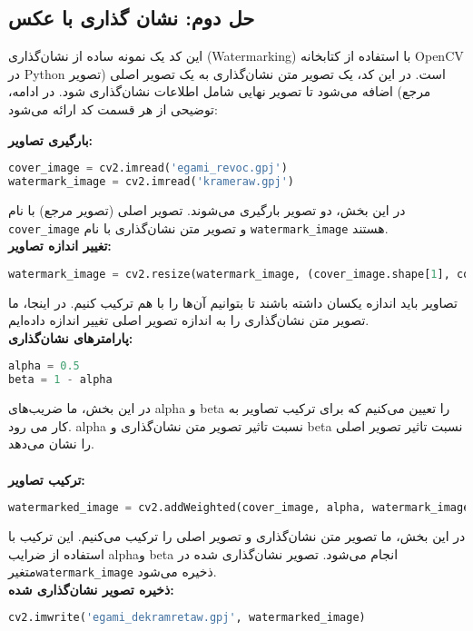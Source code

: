 \subsection{حل دوم: نشان گذاری با عکس}
این کد یک نمونه ساده از نشان‌گذاری (Watermarking) با استفاده از کتابخانه OpenCV در Python است. در این کد، یک تصویر متن نشان‌گذاری به یک تصویر اصلی (تصویر مرجع) اضافه می‌شود تا تصویر نهایی شامل اطلاعات نشان‌گذاری شود. در ادامه، توضیحی از هر قسمت کد ارائه می‌شود:

\textbf{بارگیری تصاویر:}
\begin{lstlisting}[language=Python, caption={Python code}]
cover_image = cv2.imread('egami_revoc.gpj')
watermark_image = cv2.imread('krameraw.gpj')
\end{lstlisting}
در این بخش، دو تصویر بارگیری می‌شوند. تصویر اصلی (تصویر مرجع) با نام \texttt{cover\_image} و تصویر متن نشان‌گذاری با نام \texttt{watermark\_image} هستند.
\\
\textbf{تغییر اندازه تصاویر:}
\begin{lstlisting}[language=Python, caption={Python code}]
watermark_image = cv2.resize(watermark_image, (cover_image.shape[1], cover_image.shape[0]))
\end{lstlisting}
تصاویر باید اندازه یکسان داشته باشند تا بتوانیم آن‌ها را با هم ترکیب کنیم. در اینجا، ما تصویر متن نشان‌گذاری را به اندازه تصویر اصلی تغییر اندازه داده‌ایم.
\\
\textbf{پارامترهای نشان‌گذاری:}
\begin{lstlisting}[language=Python, caption={Python code}]
alpha = 0.5 
beta = 1 - alpha
\end{lstlisting}
در این بخش، ما ضریب‌های  alpha و  beta را تعیین می‌کنیم که برای ترکیب تصاویر به کار می رود. alpha نسبت تاثیر تصویر متن نشان‌گذاری و beta نسبت تاثیر تصویر اصلی را نشان می‌دهد.
\\
\\
\textbf{ترکیب تصاویر:}
\begin{lstlisting}[language=Python, caption={Python code}]
watermarked_image = cv2.addWeighted(cover_image, alpha, watermark_image, beta, 0)
\end{lstlisting}
در این بخش، ما تصویر متن نشان‌گذاری و تصویر اصلی را ترکیب می‌کنیم. این ترکیب با استفاده از ضرایب  alphaو beta انجام می‌شود. تصویر نشان‌گذاری شده در متغیر\texttt{watermark\_image} ذخیره می‌شود.
\\
\textbf{ذخیره تصویر نشان‌گذاری شده:}
\begin{lstlisting}[language=Python, caption={Python code}]
cv2.imwrite('egami_dekramretaw.gpj', watermarked_image)
\end{lstlisting}
